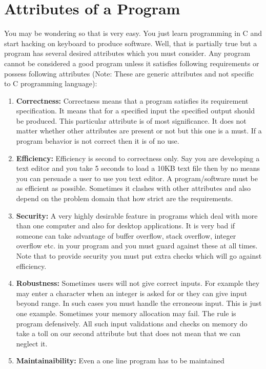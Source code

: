 \section{Attributes of a Program}
You may be wondering so that is very easy. You just learn programming in C and
start hacking on keyboard to produce software. Well, that is partially true but
a program has several desired attributes which you must consider. Any program
cannot be considered a good program unless it satisfies following requirements
or possess following attributes (Note: These are generic attributes and not
specific to C programming language):
\begin{enumerate}
\item \textbf{Correctness:}  Correctness means that a program satisfies its
  requirement specification. It means that for a specified input the specified
  output should be produced. This particular attribute is of most
  significance. It does not matter whether other attributes are present or not
  but this one is a must. If a program behavior is not correct then it is of no
  use.
\item \textbf{Efficiency:} Efficiency is second to correctness only. Say you
  are developing a text editor and you take 5 seconds to load a 10KB text file
  then by no means you can persuade a user to use you text editor. A
  program/software must be as efficient as possible. Sometimes it clashes with
  other attributes and also depend on the problem domain that how strict are
  the requirements.
\item \textbf{Security:} A very highly desirable feature in programs which deal
  with more than one computer and also for desktop applications. It is very bad
  if someone can take advantage of buffer overflow, stack overflow, integer
  overflow etc. in your program and you must guard against these at all
  times. Note that to provide security you must put extra checks which will go
  against efficiency.
\item \textbf{Robustness:} Sometimes users will not give correct inputs. For
  example they may enter a character when an integer is asked for or they can
  give input beyond range. In such cases you must handle the erroneous
  input. This is just one example. Sometimes your memory allocation may
  fail. The rule is program defensively. All such input validations and checks
  on memory do take a toll on our second attribute but that does not mean that
  we can neglect it.
\item \textbf{Maintainaibility:} Even a one line program has to be maintained

\end{enumerate}
